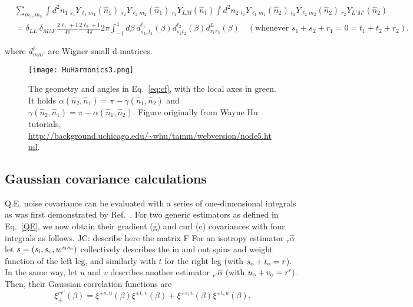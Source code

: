 \documentclass[reprint,prd, superscriptaddress, tightenlines, longbibliography, nofootinbib, eqsecnum, amsfonts, amsmath, floatfix, notitlepage, twocolumn]{revtex4-1}
\newcommand{\si}[0]{{s_{\rm i}}}
\newcommand{\so}[0]{{s_{\rm o}}}
\renewcommand{\to}[0]{{t_{\rm o}}}
\newcommand{\uo}[0]{{u_{\rm o}}}
\newcommand{\vo}[0]{{v_{\rm o}}}
\newcommand{\av}[1]{\left\langle #1 \right\rangle}
\newcommand{\JC}[1]{\color{red}JC: #1\color{black}}
\newcommand{\hn}[0]{\hat n}
\begin{document}
\begin{widetext}
\begin{equation}
\begin{split}
&\sum_{m_1,m_2}\int d^2n_1\:_{s_1} Y_{\ell_1 m_1}(\hn_1)\:_{s_2} Y_{\ell_2 m_2}(\hn_1)\:_{r_1} Y_{L M}(\hn_1)\int d^2n_2\:_{t_1} Y_{\ell_1 m_1}(\hn_2)\:_{t_2} Y_{\ell_2 m_2}(\hn_2)\:_{r_2} Y_{L' M'}(\hn_2)  \\&= \delta_{LL'}\delta_{MM'}\frac{2\ell_1 + 1}{4\pi}\frac{2\ell_2 + 1} {4\pi} 2\pi \int_{-1}^{1} d\beta \: d^{\ell_1}_{s_1,t_1}(\beta)d^{\ell_2}_{s_2 t_2}(\beta)d^{L}_{r_1 r_2}(\beta) \quad (\textrm{whenever } s_1 + s_2 + r_1  = 0 = t_1 + t_2 + r_2).
\end{split}
\end{equation}
\end{widetext}
where $d^\ell_{mm'}$ are Wigner small d-matrices.
\begin{figure}[h]
	\texttt{[image: HuHarmonics3.png]}
	\caption{\label{fig:geometry}The geometry and angles in Eq.~\eqref{eq:cf}, with the local axes in green. It holds $\alpha(\hn_2, \hn_1) = \pi - \gamma(\hn_1, \hn_2)$ and $ \gamma(\hn_2, \hn_1) = \pi - \alpha(\hn_1, \hn_2)$. Figure originally from Wayne Hu tutorials, \url{http://background.uchicago.edu/~whu/tamm/webversion/node5.html}.}
\end{figure}
\subsection{Gaussian covariance calculations}
Q.E. noise covariance can be evaluated with a series of one-dimensional integrals as was first demonstrated by Ref.~\cite{}. For two generic estimators as defined in Eq.~\eqref{QE}, we now obtain their gradient (g) and curl (c) covariances with four integrals as follows.
\JC{describe here the matrix F}
For an isotropy estimator $_{r}\hat \alpha$ let $s = (\si, \so, w^{\si\so})$ collectively describes the in and out spins and weight function of the left leg, and similarly with $t$ for the right leg (with $\so + \to = r$). In the same way, let $u$ and $v$ describes another estimator $_{r'}\hat \alpha$ (with $\uo + \vo = r'$). Then, their Gaussian correlation functions are
\begin{equation}\boxed{
	\xi^{rr'}_{\pm}(\beta) = \xi^{\pm s, u}(\beta) \xi^{\pm t, v}(\beta) +  \xi^{\pm s, v}(\beta) \xi^{\pm t, u}(\beta)},
\end{equation}

\end{document}
